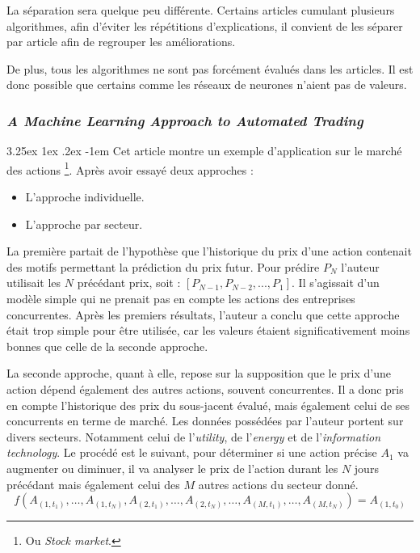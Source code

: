 \documentclass[a4paper, 11pt]{article}
\makeatletter
\newcounter{subsubsubsection}[subsubsection]
\renewcommand\paragraph{\@startsection{paragraph}{5}{\z@}%
  {3.25ex \@plus1ex \@minus.2ex}%
  {-1em}%
  {\normalfont\normalsize\bfseries}}
\makeatother
\begin{document}
La séparation sera quelque peu différente. Certains articles cumulant plusieurs algorithmes, afin d'éviter
les répétitions d'explications, il convient de les séparer par article afin de regrouper les améliorations.

De plus, tous les algorithmes ne sont pas forcément évalués dans les articles. Il est donc possible que certains
comme les réseaux de neurones n'aient pas de valeurs.

\subsubsection{\textit{A Machine Learning Approach to Automated Trading}}

\paragraph{}
Cet article montre un exemple d'application sur le marché des actions \cite{machine_learning_automated_trading}
\footnote{Ou \textit{Stock market}.}. Après avoir essayé deux approches :
\begin{itemize}
\item L'approche individuelle.
\item L'approche par secteur.
\end{itemize}

La première partait de l'hypothèse que l'historique du prix d'une action contenait des motifs permettant la prédiction
du prix futur. Pour prédire $P_N$ l'auteur utilisait les $N$ précédant prix, soit : $[P_{N-1}, P_{N-2},...,P_1]$. Il s'agissait d'un modèle simple qui ne prenait pas en compte les actions des entreprises concurrentes.
Après les premiers résultats, l'auteur a conclu que cette approche
était trop simple pour être utilisée, car les valeurs étaient significativement moins bonnes que celle de la
seconde approche\cite{machine_learning_automated_trading}.

La seconde approche, quant à elle, repose sur la supposition que le prix d'une action dépend également des autres actions,
souvent concurrentes. Il a donc pris en compte l'historique des prix du sous-jacent évalué, mais également celui de ses
concurrents en terme de marché. Les données possédées par l'auteur portent sur divers secteurs. Notamment celui
de l'\textit{utility}, de l'\textit{energy} et de l'\textit{information technology}. Le procédé est le suivant,
pour déterminer si une action précise $A_1$ va augmenter ou diminuer, il va analyser le prix de l'action durant les $N$ jours
précédant mais également celui des $M$ autres actions du secteur donné.
$$f(A_{(1,t_1)},\dots, A_{(1,t_N)}, A_{(2,t_1)}, \dots, A_{(2,t_N)}, \dots, A_{(M,t_1)},\dots,A_{(M,t_N)}) = A_{(1,t_0)}$$
\end{document}
